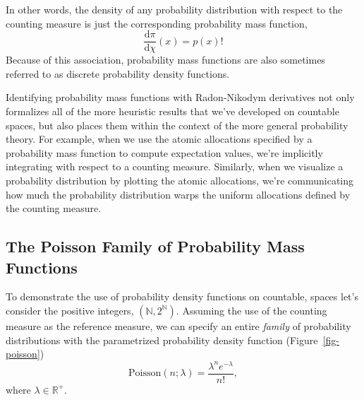 \documentclass[
  letterpaper,
  DIV=11,
  numbers=noendperiod]{scrartcl}
\begin{document}
In other words, the density of any probability distribution with respect
to the counting measure is just the corresponding probability mass
function, \[
\frac{ \mathrm{d} \pi }{ \mathrm{d} \chi }(x) = p(x)!
\] Because of this association, probability mass functions are also
sometimes referred to as discrete probability density functions.

Identifying probability mass functions with Radon-Nikodym derivatives
not only formalizes all of the more heuristic results that we've
developed on countable spaces, but also places them within the context
of the more general probability theory. For example, when we use the
atomic allocations specified by a probability mass function to compute
expectation values, we're implicitly integrating with respect to a
counting measure. Similarly, when we visualize a probability
distribution by plotting the atomic allocations, we're communicating how
much the probability distribution warps the uniform allocations defined
by the counting measure.

\subsection{The Poisson Family of Probability Mass
Functions}\label{the-poisson-family-of-probability-mass-functions}

To demonstrate the use of probability density functions on countable,
spaces let's consider the positive integers,
\((\mathbb{N}, 2^{\mathbb{N}})\). Assuming the use of the counting
measure as the reference measure, we can specify an entire \emph{family}
of probability distributions with the parametrized probability density
function (Figure~\ref{fig-poisson}) \[
\mathrm{Poisson}(n; \lambda)
=
\frac{ \lambda^{n} e^{-\lambda} }{ n! },
\] where \(\lambda \in \mathbb{R}^{+}\).
\end{document}
